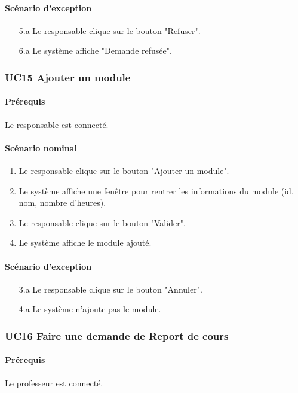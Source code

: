 \documentclass[a4paper,12pt]{article}
\begin{document}
\paragraph{Scénario d'exception}
\begin{enumerate}
    \item[5.a] Le responsable clique sur le bouton "Refuser".
    \item[6.a] Le système affiche "Demande refusée".
\end{enumerate}

\subsubsection{UC15 Ajouter un module}
\paragraph{Prérequis} Le responsable est connecté.

\paragraph{Scénario nominal}
\begin{enumerate}
    \item Le responsable clique sur le bouton "Ajouter un module".
    \item Le système affiche une fenêtre pour rentrer les informations du module (id, nom, nombre d'heures).
    \item Le responsable clique sur le bouton "Valider".
    \item Le système affiche le module ajouté.
\end{enumerate}

\paragraph{Scénario d'exception}
\begin{enumerate}
    \item[3.a] Le responsable clique sur le bouton "Annuler".
    \item[4.a] Le système n'ajoute pas le module.
\end{enumerate}

\subsubsection{UC16 Faire une demande de Report de cours}
\paragraph{Prérequis} Le professeur est connecté.
\end{document}

